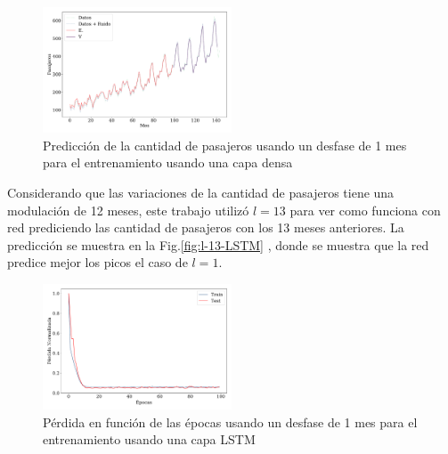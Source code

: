 \begin{figure}[H]
	\begin{small}
		\begin{center}
			\includegraphics[width=0.5\textwidth]{prediccion_l-1_dense.pdf}
		\end{center}
		\caption{Predicción de la cantidad de pasajeros usando un desfase de 1 mes para el entrenamiento usando una capa densa}
		\label{fig:l-1-Densa}
	\end{small}
\end{figure}

Considerando que las variaciones de la cantidad de pasajeros tiene una modulación de 12 meses, este trabajo utilizó $l=13$ para ver como funciona con red prediciendo las cantidad de pasajeros con los 13 meses anteriores. La predicción se muestra en la Fig.\ref{fig:l-13-LSTM} , donde se muestra que la red predice  mejor  los picos el caso de $l=1$.


\begin{figure}[H]
	\begin{small}
		\begin{center}
			\includegraphics[width=0.5\textwidth]{prediccion_l-1_loss.pdf}
		\end{center}
		\caption{Pérdida en función de las épocas usando un desfase de 1 mes para el entrenamiento usando una capa LSTM}
		\label{fig:l-1-LSTM}
	\end{small}
\end{figure}


